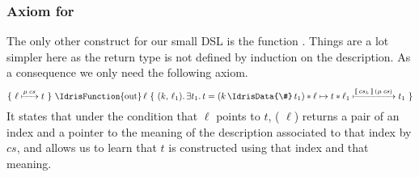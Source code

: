 \subsubsection{Axiom for }

The only other construct for our small DSL is the function .
Things are a lot simpler here as the return type
is not defined by induction on the description.
As a consequence we only need the following axiom.
\[
\Hoare
    {\Pointer{\ell}{\Mu{cs}}{t}}
    {\text{\IdrisFunction{out}}\,\ell}
    {(k,\, \ell_1)}
    {\exists t_1.\, t = (k \,\text{\IdrisData{\#}}\, t_1)
      \ast \Pointer{\ell}{}{t} \ast \Pointer{\ell_1}{\Meaning{cs_k}{cs}}{t_1}}
\]
It states that under the condition that $\ell$ points to $t$,
( $\ell$) returns a pair of an index
and a pointer to the meaning of the description associated to that index by $cs$,
and allows us to learn that $t$ is constructed using that index
and that meaning.
